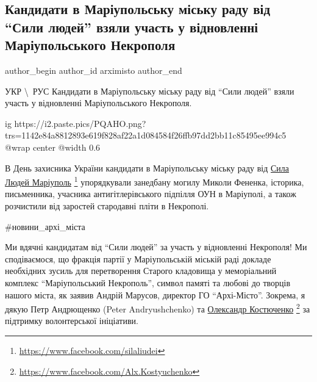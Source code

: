 
 
 
 
 

\subsection{Кандидати в Маріупольську міську раду від \enquote{Сили людей} взяли участь у відновленні Маріупольського Некрополя}
\label{sec:16_10_2020.fb.arximisto.1.kandydaty_syla_ljudej_mar_misk_rada_vidnovlennja_nekropol}

\ifcmt
 author_begin
   author_id arximisto
 author_end
\fi

УКР \textbackslash\ РУС Кандидати в Маріупольську міську раду від \enquote{Сили
людей} взяли участь у відновленні Маріупольського Некрополя. 

\ifcmt
  ig https://i2.paste.pics/PQAHO.png?trs=1142e84a8812893e619f828af22a1d084584f26ffb97dd2bb11c85495ee994c5
  @wrap center
  @width 0.6
\fi

В День захисника України кандидати в Маріупольську міську раду від \href{https://www.facebook.com/silaliudei}{Сила Людей
Маріуполь}%
\footnote{\url{https://www.facebook.com/silaliudei}}
упорядкували занедбану могилу Миколи Фененка, історика, письменника,
учасника антигітлерівського підпілля ОУН в Маріуполі, а також розчистили від
заростей стародавні пліти в Некрополі.

\#новини\_архі\_міста

Ми вдячні кандидатам від \enquote{Сили людей} за участь у відновленні Некрополя! Ми
сподіваємося, що фракція партії у Маріупольській міській раді докладе
необхідних зусиль для перетворення Старого кладовища у меморіальний комплекс
\enquote{Маріупольський Некрополь}, символ памяті та любові до творців нашого міста, як
заявив Андрій Марусов, директор ГО \enquote{Архі-Місто}. Зокрема, я дякую Петр
Андрющенко (Peter Andryushchenko) та \href{https://www.facebook.com/Alx.Kostyuchenko}{Олександр Костюченко}%
\footnote{\url{https://www.facebook.com/Alx.Kostyuchenko}}
за підтримку волонтерської ініціативи. 

